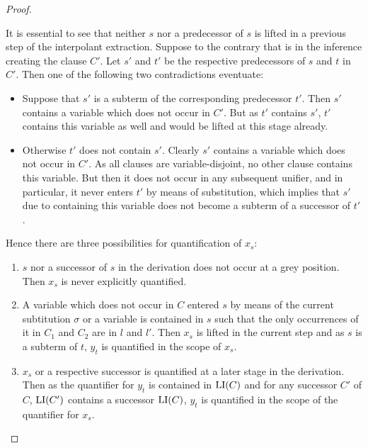 \documentclass[,%
	draft=false,%
	numbers=noendperiod
	11pt,
	a4paper,
	oneside,%
	openany,
]{memoir}
\begin{document}
\begin{proof}
\begin{description}
			It is essential to see that neither $s$ nor a predecessor of $s$ is lifted in a previous step of the interpolant extraction.
			Suppose to the contrary that is in the inference creating the clause $C'$.
			Let $s'$ and $t'$ be the respective predecessors of $s$ and $t$ in $C'$.
			Then one of the following two contradictions eventuate:
			\begin{itemize}
				\item Suppose that $s'$ is a subterm of the corresponding predecessor $t'$.
					Then $s'$ contains a variable which does not occur in $C'$. But as $t'$ contains $s'$, $t'$ contains this variable as well and would be lifted at this stage already.
				\item Otherwise $t'$ does not contain $s'$.
					Clearly $s'$ contains a variable which does not occur in $C'$.
					As all clauses are variable-disjoint, no other clause contains this variable.
					But then it does not occur in any subsequent unifier, and in particular, it never enters $t'$ by means of substitution, which implies that $s'$ due to containing this variable does not become a subterm of a successor of $t'$.

			\end{itemize}

			Hence there are three possibilities for quantification of $x_s$:
			\begin{enumerate}
			\item $s$ nor a successor of $s$ in the derivation does not occur at a grey position. Then $x_s$ is never explicitly quantified.
			\item A variable which does not occur in $C$ entered $s$ by means of the current subtitution $\sigma$ or a variable is contained in $s$ such that the only occurrences of it in $C_1$ and $C_2$ are in $l$ and $l'$.
				Then $x_s$ is lifted in the current step and as $s$ is a subterm of $t$, $y_t$ is quantified in the scope of $x_s$.
			\item $x_s$ or a respective successor is quantified at a later stage in the derivation.
				Then as the quantifier for $y_t$ is contained in $\operatorname{LI}(C)$ and for any successor $C'$ of $C$, $\operatorname{LI}(C')$ contains a successor $\operatorname{LI}(C)$, $y_t$ is quantified in the scope of the quantifier for $x_s$.
			\end{enumerate}



	\end{description}


\end{proof}
\end{document}
